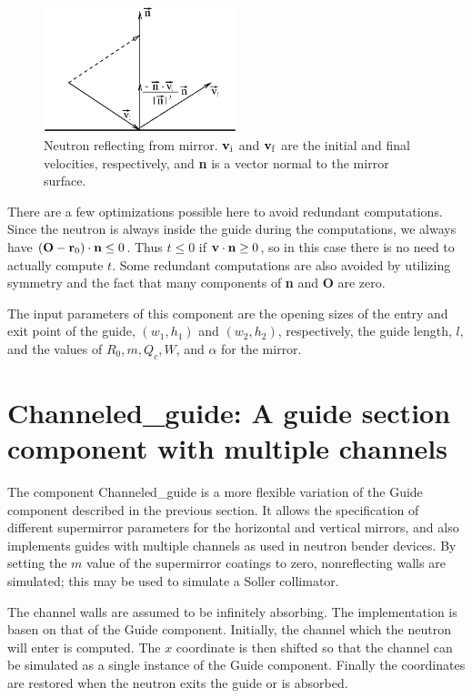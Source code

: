 \begin{figure}
  \begin{center}
    \includegraphics[width=0.5\textwidth]{figures/guide2.eps}
  \end{center}
\caption{Neutron reflecting from mirror. ${\bf v}_{\rm i}$ and 
${\bf v}_{\rm f}$ are the initial and final velocities, respectively,
and {\bf n} is a vector normal to the mirror surface.}
\label{f:guidereflect}
\end{figure}

There are a few optimizations possible here to avoid redundant
computations. Since the neutron is always inside the guide during the
computations, we always have 
$({\bf O} - {\bf r}_0) \cdot {\bf n} \leq 0$. 
Thus $t \leq 0$ if ${\bf v} \cdot {\bf n} \geq 0$, so in this case
there is no need to actually compute $t$. Some redundant computations
are also avoided by utilizing symmetry and the fact that many
components of {\bf n} and {\bf O} are zero.

The input parameters of this component are
the opening sizes of the entry and exit point of the
guide, $(w_1, h_1)$ and $(w_2, h_2)$, respectively,
the guide length, $l$,
and the values of $R_0, m, Q_c, W$, and $\alpha$ for the mirror.


\section{Channeled\_guide: A guide section component with multiple channels}
\label{s:channeled_guide}

The component Channeled\_guide is a more flexible variation of the Guide
component described in the previous section. It allows the specification
of different supermirror parameters for the horizontal and vertical
mirrors, and also implements guides with multiple channels as used in
neutron bender devices. By setting the $m$ value of the supermirror
coatings to zero, nonreflecting walls are
simulated; this may be used to simulate a Soller collimator.

The channel walls are assumed to be infinitely absorbing. The
implementation is basen on that of the Guide component. Initially, the
channel which the neutron will enter is computed. The $x$ coordinate is
then shifted so that the channel can be simulated as a single instance
of the Guide component. Finally the coordinates are restored when the
neutron exits the guide or is absorbed.

